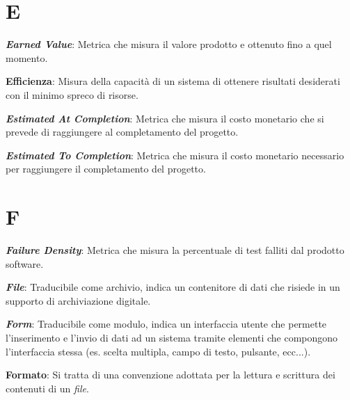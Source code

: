 \documentclass[5pt]{article}
\begin{document}
\section*{E}

\textbf{\textit{Earned Value}}: Metrica che misura il valore prodotto e ottenuto fino a quel momento.\newline

\textbf{Efficienza}: Misura della capacità di un sistema di ottenere risultati desiderati con il minimo spreco di risorse.\newline

\textbf{\textit{Estimated At Completion}}: Metrica che misura il costo monetario che si prevede di raggiungere al completamento del progetto.\newline

\textbf{\textit{Estimated To Completion}}: Metrica che misura il costo monetario necessario per raggiungere il completamento del progetto.\newline


\pagebreak

\section*{F}
\begin{flushleft}
	
\textbf{\textit{Failure Density}}: Metrica che misura la percentuale di test falliti dal prodotto software.\newline

\textbf{\textit{File}}: Traducibile come archivio, indica un contenitore di dati che risiede in un supporto di archiviazione digitale.\newline

\textbf{\textit{Form}}: Traducibile come modulo, indica un interfaccia utente che permette l'inserimento e l'invio di dati ad un sistema tramite elementi che compongono l'interfaccia stessa (es. scelta multipla, campo di testo, pulsante, ecc...).\newline

\textbf{Formato}: Si tratta di una convenzione adottata per la lettura e scrittura dei contenuti di un \textit{file}.

\end{flushleft}
\end{document}
